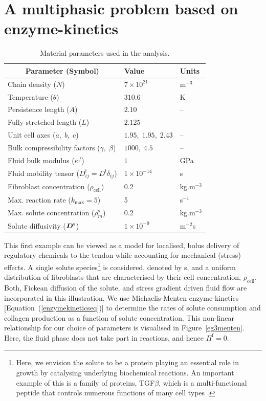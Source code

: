 \section{A multiphasic problem based on enzyme-kinetics}
\label{enzyme-kinetics-example}

\begin{table}
\centering
\begin{tabular}{lll}
\hline
\multicolumn{1}{c}{Parameter (Symbol)} & Value & Units\\
\hline
Chain density ($N$) & $7\times 10^{21}$ & $\mathrm{m}^{-3}$\\
Temperature ($\theta$)  & $310.6$ & K\\
Persistence length ($A$) & $2.10$ & --\\
Fully-stretched length ($L$) & $2.125$ & --\\
Unit cell axes ($a,\;b,\;c$) & $1.95,\;1.95,\;2.43$ & --\\
Bulk compressibility factors ($\gamma,\;\beta$) & $1000,\; 4.5$ & --\\
Fluid bulk modulus ($\kappa^f$) & $1$ & GPa\\
Fluid mobility tensor ($D^\mathrm{f}_{ij} = D^\mathrm{f}\delta_{ij}$) & $1\times 10^{-14}$
&s\\
Fibroblast concentration ($\rho_{\mathrm{cell}}$) & 0.2 &
kg.m$^{-3}$\\
Max. reaction rate ($k_{\mathrm{max}} = 5$) & 5 & s$^{-1}$\\
Max. solute concentration ($\rho^{\mathrm{s}}_m$) & 0.2 &
kg.m$^{-3}$\\
Solute diffusivity ($\mbox{\boldmath$ D$}^\mathrm{s}$) & $1\times 10^{-9}$ &  m$^{-2}$s\\
\hline
\end{tabular}
\caption{Material parameters used in the analysis.}
\label{parameters}
\end{table}

This first example can be viewed as a model for localised, bolus
delivery of regulatory chemicals to the tendon while accounting for
mechanical (stress) effects. A single solute species\footnote{Here, we
  envision the solute to be a protein playing 
  an essential role in growth by catalysing underlying biochemical
  reactions. An important example of this is a family of proteins,
  TGF$\beta$, which is a multi-functional peptide that controls numerous
  functions of many cell types \citep{Alberts:02}.} is considered,
denoted by s, and 
a uniform distribution of fibroblasts that are characterised by their
cell concentration, $\rho_{\mathrm{cell}}$. Both, Fickean diffusion of
the solute, and stress gradient driven fluid flow are incorporated in this
illustration. We use 
Michaelis-Menten enzyme kinetics [Equation~(\ref{enzymekineticseq})]
to determine the rates of solute consumption and collagen production
as a function of solute concentration. This non-linear relationship for
our choice of parameters is visualised in
Figure~\ref{eg3menten}. Here, the fluid phase does not  take part in
reactions, and hence $\Pi^\mathrm{f}=0$. 

